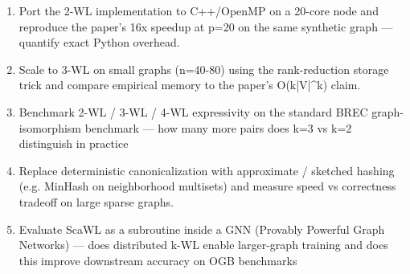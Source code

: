 \documentclass[11pt]{article}
\begin{document}
\begin{enumerate}[leftmargin=1.6em,itemsep=0.2em,topsep=0.2em,label=Q\arabic*.]
\item Port the 2-WL implementation to C++/OpenMP on a 20-core node and reproduce the paper's 16x speedup at p=20 on the same synthetic graph --- quantify exact Python overhead.
\item Scale to 3-WL on small graphs (n=40-80) using the rank-reduction storage trick and compare empirical memory to the paper's O(k|V|\textasciicircum{}k) claim.
\item Benchmark 2-WL / 3-WL / 4-WL expressivity on the standard BREC graph-isomorphism benchmark --- how many more pairs does k=3 vs k=2 distinguish in practice
\item Replace deterministic canonicalization with approximate / sketched hashing (e.g. MinHash on neighborhood multisets) and measure speed vs correctness tradeoff on large sparse graphs.
\item Evaluate ScaWL as a subroutine inside a GNN (Provably Powerful Graph Networks) --- does distributed k-WL enable larger-graph training and does this improve downstream accuracy on OGB benchmarks
\end{enumerate}
\end{document}
